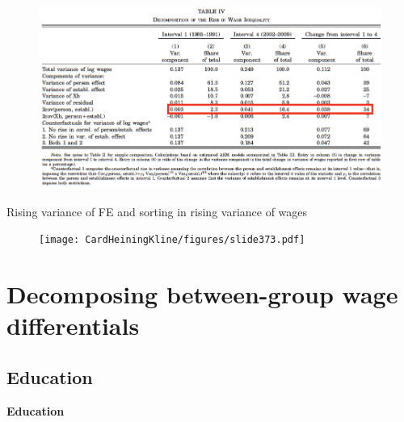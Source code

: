 \documentclass[notes=show]{beamer}
\begin{document}
\begin{frame}
\begin{figure}[p!]
 \includegraphics[width=\textwidth]{figures/Table4d} 
\end{figure}
\end{frame}

\begin{frame}{Rising variance of FE and sorting in rising variance of wages}
\begin{figure}[p!]
 \texttt{[image: CardHeiningKline/figures/slide373.pdf]} 
\end{figure}
\end{frame}

\section{Decomposing between-group wage differentials}

\subsection*{Education}

\begin{frame}
	\centering
	\textbf{Education}
\end{frame}
\end{document}
